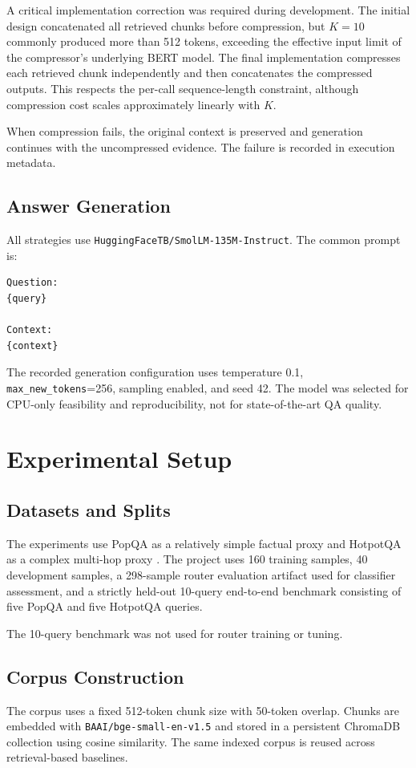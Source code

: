 \documentclass[conference]{IEEEtran}
\begin{document}
A critical implementation correction was required during development. The initial design concatenated all retrieved chunks before compression, but $K=10$ commonly produced more than 512 tokens, exceeding the effective input limit of the compressor's underlying BERT model. The final implementation compresses each retrieved chunk independently and then concatenates the compressed outputs. This respects the per-call sequence-length constraint, although compression cost scales approximately linearly with $K$.

When compression fails, the original context is preserved and generation continues with the uncompressed evidence. The failure is recorded in execution metadata.

\subsection{Answer Generation}
All strategies use \texttt{HuggingFaceTB/SmolLM-135M-Instruct}. The common prompt is:
\begin{verbatim}
Question:
{query}

Context:
{context}
\end{verbatim}
The recorded generation configuration uses temperature 0.1, \texttt{max\_new\_tokens}=256, sampling enabled, and seed 42. The model was selected for CPU-only feasibility and reproducibility, not for state-of-the-art QA quality.

\section{Experimental Setup}

\subsection{Datasets and Splits}
The experiments use PopQA as a relatively simple factual proxy and HotpotQA as a complex multi-hop proxy \cite{mallen2023trust,yang2018hotpotqa}. The project uses 160 training samples, 40 development samples, a 298-sample router evaluation artifact used for classifier assessment, and a strictly held-out 10-query end-to-end benchmark consisting of five PopQA and five HotpotQA queries.

The 10-query benchmark was not used for router training or tuning.

\subsection{Corpus Construction}
The corpus uses a fixed 512-token chunk size with 50-token overlap. Chunks are embedded with \texttt{BAAI/bge-small-en-v1.5} and stored in a persistent ChromaDB collection using cosine similarity. The same indexed corpus is reused across retrieval-based baselines.
\end{document}
